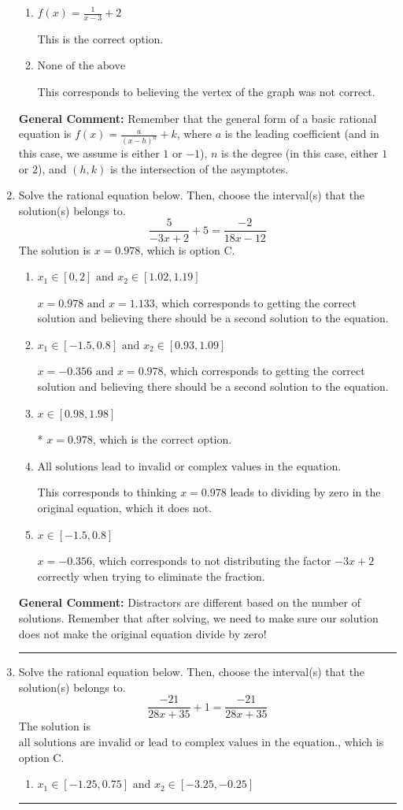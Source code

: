 \documentclass{extbook}[14pt]
\newcommand{\litem}[1]{\item #1

\rule{\textwidth}{0.4pt}}
\begin{document}
\begin{enumerate}
{\begin{enumerate}[label=\Alph*.]
Corresponds to thinking the graph was a shifted version of $\frac{1}{x^2}$, using the general form $f(x) = \frac{a}{x+h}+k$, and the opposite leading coefficient.
\item \( f(x) = \frac{1}{x - 3} + 2 \)

This is the correct option.
\item \( \text{None of the above} \)

This corresponds to believing the vertex of the graph was not correct.
\end{enumerate}

\textbf{General Comment:} Remember that the general form of a basic rational equation is $ f(x) = \frac{a}{(x-h)^n} + k$, where $a$ is the leading coefficient (and in this case, we assume is either $1$ or $-1$), $n$ is the degree (in this case, either $1$ or $2$), and $(h, k)$ is the intersection of the asymptotes.
}
\litem{
Solve the rational equation below. Then, choose the interval(s) that the solution(s) belongs to.
\[ \frac{5}{-3x + 2} + 5 = \frac{-2}{18x -12} \]The solution is \( x = 0.978 \), which is option C.\begin{enumerate}[label=\Alph*.]
\item \( x_1 \in [0, 2] \text{ and } x_2 \in [1.02,1.19] \)

$x = 0.978 \text{ and } x = 1.133$, which corresponds to getting the correct solution and believing there should be a second solution to the equation.
\item \( x_1 \in [-1.5, 0.8] \text{ and } x_2 \in [0.93,1.09] \)

$x = -0.356 \text{ and } x = 0.978$, which corresponds to getting the correct solution and believing there should be a second solution to the equation.
\item \( x \in [0.98,1.98] \)

* $x = 0.978$, which is the correct option.
\item \( \text{All solutions lead to invalid or complex values in the equation.} \)

This corresponds to thinking $x = 0.978$ leads to dividing by zero in the original equation, which it does not.
\item \( x \in [-1.5,0.8] \)

$x = -0.356$, which corresponds to not distributing the factor $-3x + 2$ correctly when trying to eliminate the fraction.
\end{enumerate}

\textbf{General Comment:} Distractors are different based on the number of solutions. Remember that after solving, we need to make sure our solution does not make the original equation divide by zero!
}
\litem{
Solve the rational equation below. Then, choose the interval(s) that the solution(s) belongs to.
\[ \frac{-21}{28x + 35} + 1 = \frac{-21}{28x + 35} \]The solution is \( \text{all solutions are invalid or lead to complex values in the equation.} \), which is option C.\begin{enumerate}[label=\Alph*.]
\item \( x_1 \in [-1.25, 0.75] \text{ and } x_2 \in [-3.25,-0.25] \)


\end{enumerate}}
\end{enumerate}
\end{document}

